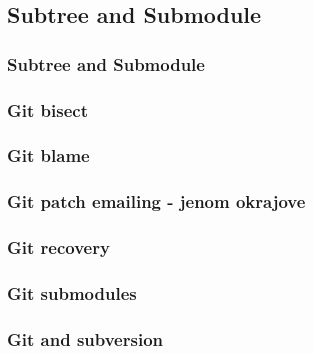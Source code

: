 \subsection{Subtree and Submodule}

\begin{frame}
	\frametitle{Subtree and Submodule}
\end{frame}

\begin{frame}
	\frametitle{Git bisect}
\end{frame}

\begin{frame}
	\frametitle{Git blame}
\end{frame}

\begin{frame}
	\frametitle{Git patch emailing - jenom okrajove}
\end{frame}

\begin{frame}
	\frametitle{Git recovery}
\end{frame}

\begin{frame}
	\frametitle{Git submodules}
\end{frame}

\begin{frame}
	\frametitle{Git and subversion}
\end{frame}



